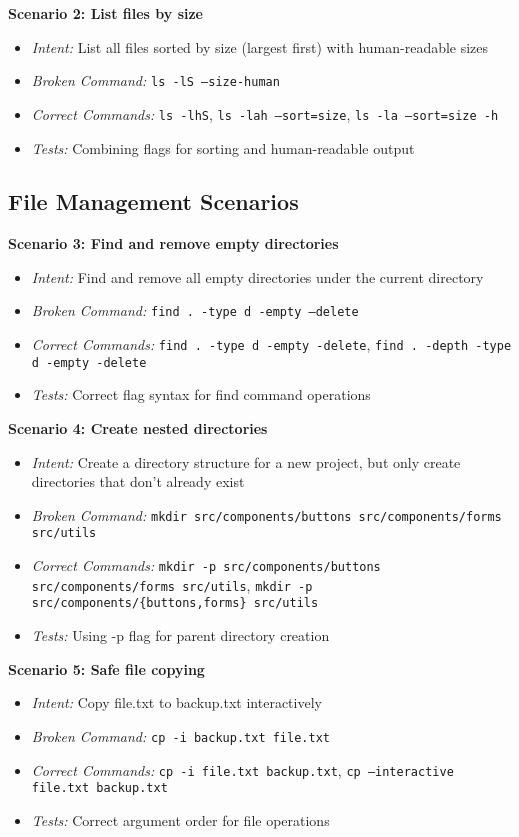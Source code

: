 \textbf{Scenario 2: List files by size}
\begin{itemize}
	\item \textit{Intent:} List all files sorted by size (largest first) with human-readable sizes
	\item \textit{Broken Command:} \texttt{ls -lS --size-human}
	\item \textit{Correct Commands:} \texttt{ls -lhS}, \texttt{ls -lah --sort=size}, \texttt{ls -la --sort=size -h}
	\item \textit{Tests:} Combining flags for sorting and human-readable output
\end{itemize}

\subsection{File Management Scenarios}

\textbf{Scenario 3: Find and remove empty directories}
\begin{itemize}
	\item \textit{Intent:} Find and remove all empty directories under the current directory
	\item \textit{Broken Command:} \texttt{find . -type d -empty --delete}
	\item \textit{Correct Commands:} \texttt{find . -type d -empty -delete}, \texttt{find . -depth -type d -empty -delete}
	\item \textit{Tests:} Correct flag syntax for find command operations
\end{itemize}

\textbf{Scenario 4: Create nested directories}
\begin{itemize}
	\item \textit{Intent:} Create a directory structure for a new project, but only create directories that don't already exist
	\item \textit{Broken Command:} \texttt{mkdir src/components/buttons src/components/forms src/utils}
	\item \textit{Correct Commands:} \texttt{mkdir -p src/components/buttons src/components/forms src/utils}, \texttt{mkdir -p src/components/\{buttons,forms\} src/utils}
	\item \textit{Tests:} Using -p flag for parent directory creation
\end{itemize}

\textbf{Scenario 5: Safe file copying}
\begin{itemize}
	\item \textit{Intent:} Copy file.txt to backup.txt interactively
	\item \textit{Broken Command:} \texttt{cp -i backup.txt file.txt}
	\item \textit{Correct Commands:} \texttt{cp -i file.txt backup.txt}, \texttt{cp --interactive file.txt backup.txt}
	\item \textit{Tests:} Correct argument order for file operations
\end{itemize}

